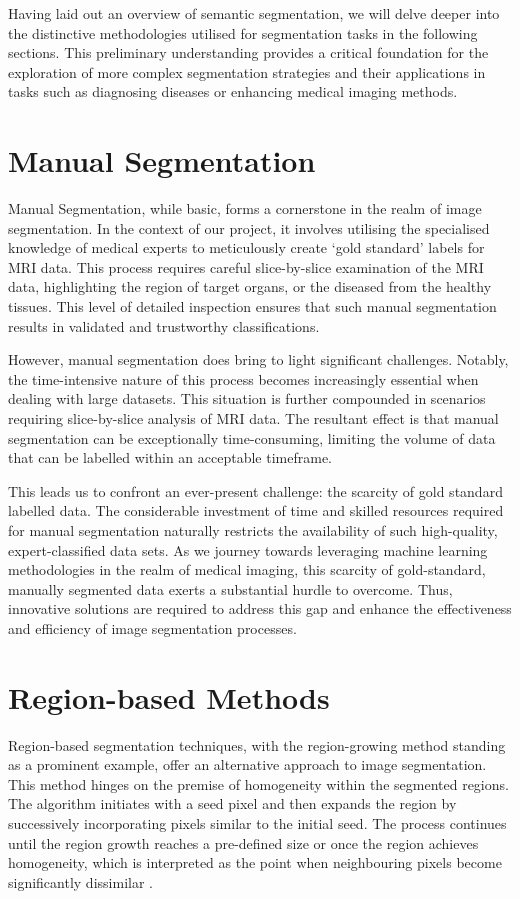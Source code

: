 Having laid out an overview of semantic segmentation, we will delve deeper into the distinctive methodologies utilised for segmentation tasks in the following sections. This preliminary understanding provides a critical foundation for the exploration of more complex segmentation strategies and their applications in tasks such as diagnosing diseases or enhancing medical imaging methods.

\section{Manual Segmentation}
\label{sec:manual-segmentation}

Manual Segmentation, while basic, forms a cornerstone in the realm of image segmentation. In the context of our project, it involves utilising the specialised knowledge of medical experts to meticulously create `gold standard' labels for MRI data. This process requires careful slice-by-slice examination of the MRI data, highlighting the region of target organs, or the diseased from the healthy tissues. This level of detailed inspection ensures that such manual segmentation results in validated and trustworthy classifications.

However, manual segmentation does bring to light significant challenges. Notably, the time-intensive nature of this process becomes increasingly essential when dealing with large datasets. This situation is further compounded in scenarios requiring slice-by-slice analysis of MRI data. The resultant effect is that manual segmentation can be exceptionally time-consuming, limiting the volume of data that can be labelled within an acceptable timeframe.

This leads us to confront an ever-present challenge: the scarcity of gold standard labelled data. The considerable investment of time and skilled resources required for manual segmentation naturally restricts the availability of such high-quality, expert-classified data sets. As we journey towards leveraging machine learning methodologies in the realm of medical imaging, this scarcity of gold-standard, manually segmented data exerts a substantial hurdle to overcome. Thus, innovative solutions are required to address this gap and enhance the effectiveness and efficiency of image segmentation processes.

\section{Region-based Methods}
Region-based segmentation techniques, with the region-growing method standing as a prominent example, offer an alternative approach to image segmentation. This method hinges on the premise of homogeneity within the segmented regions. The algorithm initiates with a seed pixel and then expands the region by successively incorporating pixels similar to the initial seed. The process continues until the region growth reaches a pre-defined size or once the region achieves homogeneity, which is interpreted as the point when neighbouring pixels become significantly dissimilar \cite{adams1994seeded}.


